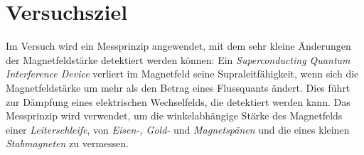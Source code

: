 \section{Versuchsziel}
Im Versuch wird ein Messprinzip angewendet,
mit dem sehr kleine Änderungen der Magnetfeldstärke detektiert werden können:
Ein \emph{Superconducting Quantum Interference Device} verliert im Magnetfeld seine Supraleitfähigkeit,
wenn sich die Magnetfeldstärke um mehr als den Betrag eines Flussquants ändert.
Dies führt zur Dämpfung eines elektrischen Wechselfelds, die detektiert werden kann.
Das Messprinzip wird verwendet, um die winkelabhängige Stärke des Magnetfelds einer \emph{Leiterschleife},
von \emph{Eisen-, Gold-} und \emph{Magnetspänen} und die eines kleinen \emph{Stabmagneten} zu vermessen.